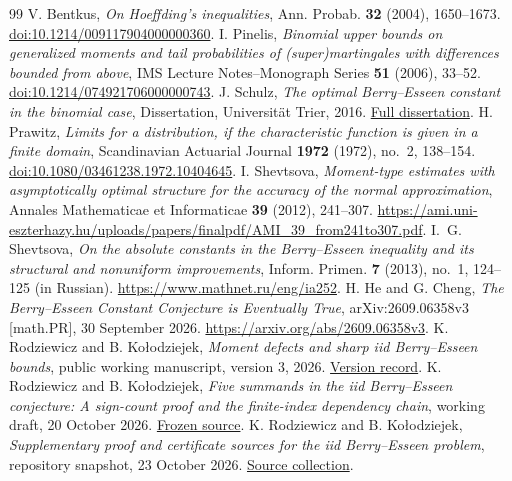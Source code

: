 \documentclass[aop,preprint]{imsart}
\theoremstyle{definition}
\numberwithin{equation}{section}
\begin{document}
\begin{thebibliography}{99}
V. Bentkus, \emph{On Hoeffding's inequalities},
Ann. Probab. \textbf{32} (2004), 1650--1673.
\href{https://doi.org/10.1214/009117904000000360}{doi:10.1214/009117904000000360}.
I. Pinelis, \emph{Binomial upper bounds on generalized moments and tail
probabilities of (super)martingales with differences bounded from above},
IMS Lecture Notes--Monograph Series \textbf{51} (2006), 33--52.
\href{https://doi.org/10.1214/074921706000000743}{doi:10.1214/074921706000000743}.
J. Schulz, \emph{The optimal Berry--Esseen constant in the binomial case},
Dissertation, Universit\"at Trier, 2016.
\href{https://d-nb.info/1197702695/34}{Full dissertation}.
H. Prawitz, \emph{Limits for a distribution, if the characteristic
function is given in a finite domain}, Scandinavian Actuarial Journal
\textbf{1972} (1972), no.~2, 138--154.
\href{https://doi.org/10.1080/03461238.1972.10404645}{doi:10.1080/03461238.1972.10404645}.
I. Shevtsova, \emph{Moment-type estimates with asymptotically optimal
structure for the accuracy of the normal approximation},
Annales Mathematicae et Informaticae \textbf{39} (2012), 241--307.
\url{https://ami.uni-eszterhazy.hu/uploads/papers/finalpdf/AMI_39_from241to307.pdf}.
I.~G. Shevtsova, \emph{On the absolute constants in the Berry--Esseen
inequality and its structural and nonuniform improvements},
Inform. Primen. \textbf{7} (2013), no.~1, 124--125 (in Russian).
\url{https://www.mathnet.ru/eng/ia252}.
H. He and G. Cheng, \emph{The Berry--Esseen Constant Conjecture is
Eventually True}, arXiv:2609.06358v3 [math.PR], 30 September 2026.
\url{https://arxiv.org/abs/2609.06358v3}.
K. Rodziewicz and B. Ko\l{}odziejek,
\emph{Moment defects and sharp iid Berry--Esseen bounds},
public working manuscript, version 3, 2026.
\href{https://hexagonmath.org/2610.00147v3}{Version record}.
K. Rodziewicz and B. Ko\l{}odziejek,
\emph{Five summands in the iid Berry--Esseen conjecture:
A sign-count proof and the finite-index dependency chain},
working draft, 20 October 2026.
\href{https://github.com/rodziewiczk/berry-esseen-045-certificate/blob/75a94708872e2bc053f42a279559b23ed91e4402/moment-defects/five-summands-2026-10-20/manuscript.tex}{Frozen source}.
K. Rodziewicz and B. Ko\l{}odziejek,
\emph{Supplementary proof and certificate sources for the iid
Berry--Esseen problem}, repository snapshot, 23 October 2026.
\href{https://github.com/rodziewiczk/berry-esseen-045-certificate/tree/75a94708872e2bc053f42a279559b23ed91e4402}{Source collection}.
\end{thebibliography}
\end{document}
